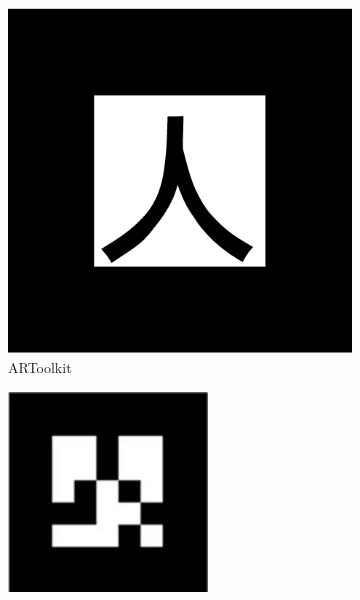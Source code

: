 \documentclass[runningheads]{llncs}
\begin{document}
\begin{figure}

 \begin{subfigure}[b]{0.19\textwidth}  
 \centering 
  \includegraphics[width=\linewidth]{pattKanji.pdf}
  \caption{ARToolkit}  
 \end{subfigure}
 \begin{subfigure}[b]{0.19\textwidth}
  \centering
  \includegraphics[width=\linewidth]{ARtag.jpg}

\end{subfigure}
\end{figure}
\end{document}
